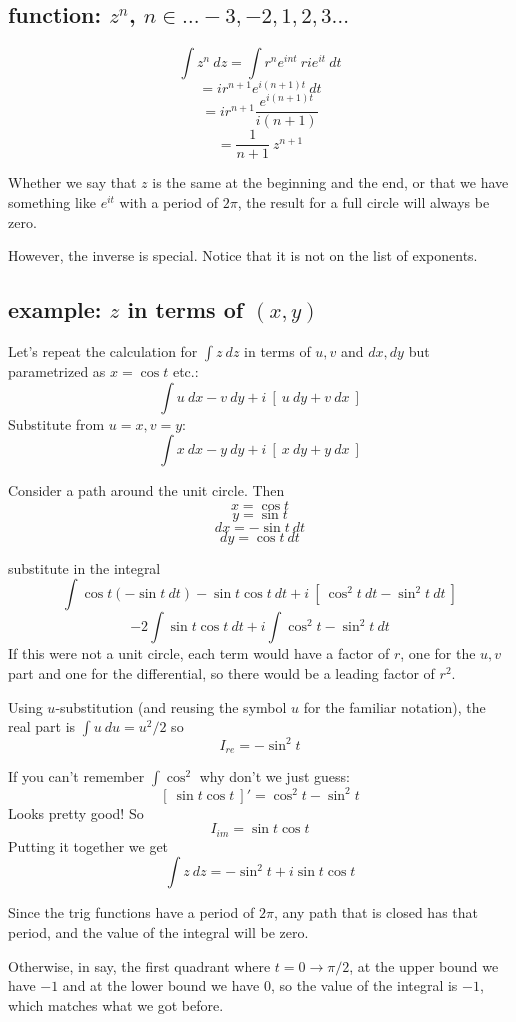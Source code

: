 \documentclass[11pt, oneside]{article}
\begin{document}
\subsection*{function:  $z^n$, $n \in \dots -3, -2, 1, 2, 3 \dots$}
\[ \int z^n \ dz = \int r^n e^{int} \ r i e^{it} \ dt \]
\[ = ir^{n+1} e^{i(n+1)t} \ dt \]
\[ = ir^{n+1} \frac{e^{i(n+1)t}}{i(n+1)} \]
\[ = \frac{1}{n + 1} \ z^{n+1} \]

Whether we say that $z$ is the same at the beginning and the end, or that we have something like $e^{it}$ with a period of $2 \pi$, the result for a full circle will always be zero.

However, the inverse is special.  Notice that it is not on the list of exponents.

\subsection*{example:  $z$ in terms of $(x,y)$}

Let's repeat the calculation for $\int z \ dz$ in terms of $u,v$ and $dx,dy$ but parametrized as $x = \cos t$ etc.:
\[ \int u \ dx - v \ dy + i \ [ \ u \ dy + v \ dx \ ] \]
Substitute from $u = x, v = y$:
\[ \int x \ dx - y \ dy + i \ [ \ x \ dy + y \ dx \ ] \]

Consider a path around the unit circle.  Then
\[ x = \cos t \]
\[ y = \sin t \]
\[ dx = -\sin t \ dt \]
\[ dy = \cos t \ dt \]

substitute in the integral
\[ \int \cos t (- \sin t \ dt) - \sin t \cos t \ dt + i \ [ \ \cos^2 t \ dt - \sin^2 t \ dt \ ] \]
\[ -2 \int \sin t \cos t \ dt + i \int  \cos^2 t - \sin^2 t \ dt \]
If this were not a unit circle, each term would have a factor of $r$, one for the $u,v$ part and one for the differential, so there would be a leading factor of $r^2$.

Using $u$-substitution (and reusing the symbol $u$ for the familiar notation), the real part is $\int u \ du = u^2/2$ so
\[ I_{re} = - \sin^2 t \]

If you can't remember $\int \cos^2$ why don't we just guess:
\[ [ \ \sin t \cos t \ ]' = \cos^2 t - \sin^2 t \]
Looks pretty good!  So
\[ I_{im} = \sin t \cos t \]
Putting it together we get
\[ \int z \ dz = - \sin^2 t + i \sin t \cos t \]

Since the trig functions have a period of $2 \pi$, any path that is closed has that period, and the value of the integral will be zero.

Otherwise, in say, the first quadrant where $t = 0 \rightarrow \pi/2$, at the upper bound we have $-1$ and at the lower bound we have $0$, so the value of the integral is $-1$, which matches what we got before.
\end{document}

